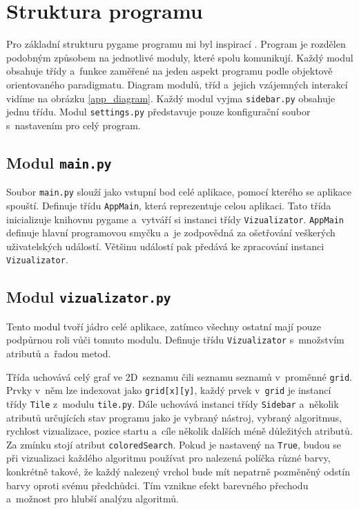 \documentclass[12pt]{report}			%
\begin{document}
			\section{Struktura programu}
			Pro základní strukturu pygame programu mi byl inspirací \cite{yt_zelda}. Program je rozdělen podobným způsobem na jednotlivé moduly, které spolu komunikují. Každý modul obsahuje třídy a~funkce zaměřené na jeden aspekt programu podle objektově orientovaného paradigmatu. Diagram modulů, tříd a~jejich vzájemných interakcí vidíme na obrázku \ref{app_diagram}. Každý modul vyjma \texttt{sidebar.py} obsahuje jednu třídu. Modul \texttt{settings.py} představuje pouze konfigurační soubor s~nastavením pro celý program.
			
			\subsection{Modul \texttt{main.py}}
			Soubor \texttt{main.py} slouží jako vstupní bod celé aplikace, pomocí kterého se aplikace spouští. Definuje třídu \texttt{AppMain}, která reprezentuje celou aplikaci. Tato třída inicializuje knihovnu pygame a~vytváří si instanci třídy \texttt{Vizualizator}. \texttt{AppMain} definuje hlavní programovou smyčku a~je zodpovědná za ošetřování veškerých uživatelských událostí. Většinu událostí pak předává ke zpracování instanci \texttt{Vizualizator}. 

			\subsection{Modul \texttt{vizualizator.py}} \label{subsection}
			Tento modul tvoří jádro celé aplikace, zatímco všechny ostatní mají pouze podpůrnou roli vůči tomuto modulu.
			Definuje třídu \texttt{Vizualizator} s~množstvím atributů a~řadou metod. 
			
			Třída uchovává celý graf ve 2D~seznamu čili seznamu seznamů v~proměnné \texttt{grid}. Prvky v~něm lze indexovat jako \texttt{grid[x][y]}, každý prvek v~\texttt{grid} je instancí třídy \texttt{Tile} z~modulu \texttt{tile.py}. Dále uchovává instanci třídy \texttt{Sidebar} a~několik atributů určujících stav programu jako je vybraný nástroj, vybraný algoritmus, rychlost vizualizace, pozice startu a~cíle několik dalších méně důležitých atributů. Za zmínku stojí atribut \texttt{coloredSearch}. %
			Pokud je nastavený na \texttt{True}, budou se při vizualizaci každého algoritmu používat pro nalezená políčka různé barvy, konkrétně takové, že každý nalezený vrchol bude mít nepatrně pozměněný odstín barvy oproti svému předchůdci. Tím vznikne efekt barevného přechodu a~možnost pro hlubší analýzu algoritmů.
			
\end{document}

